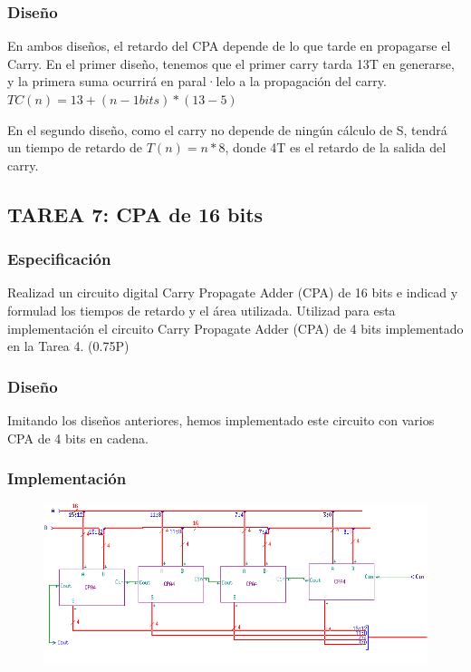 \documentclass{article}
\begin{document}
		\subsubsection*{Diseño}
		En ambos diseños, el retardo del CPA depende de lo que tarde en propagarse el Carry. En el primer diseño, tenemos que el primer carry tarda 13T en generarse, y la primera suma ocurrirá en paral·lelo a la propagación del carry. $ TC(n) = 13 + (n-1 bits) * (13-5) $
		
		En el segundo diseño, como el carry no depende de ningún cálculo de S, tendrá un tiempo de retardo de $ T(n)=n*8 $, donde 4T es el retardo de la salida del carry. 

	\subsection{TAREA 7: CPA de 16 bits}
		\subsubsection*{Especificación}
		Realizad un circuito digital Carry Propagate Adder (CPA) de 16 bits e indicad y
		formulad los tiempos de retardo y el área utilizada. Utilizad para esta implementación el circuito
		Carry Propagate Adder (CPA) de 4 bits implementado en la Tarea 4. (0.75P)

		\subsubsection*{Diseño}
		Imitando los diseños anteriores, hemos implementado este circuito con varios CPA de 4 bits en cadena.

		\subsubsection*{Implementación}
		 \begin{figure}[ht]
			\includegraphics[width=0.8\linewidth]{CPA16}
		 	\centering
		 \end{figure}
\end{document}
